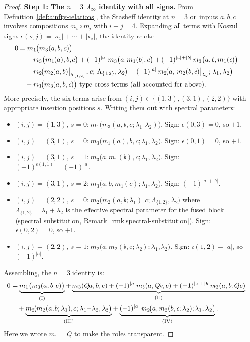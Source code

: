 \begin{proof}
\medskip
\textbf{Step 1: The $n=3$ $A_\infty$ identity with all signs.}
From Definition~\ref{def:ainfty-relations}, the Stasheff identity at $n=3$ on inputs $a,b,c$ involves compositions $m_i \circ m_j$ with $i+j=4$. Expanding all terms with Koszul signs $\epsilon(s,j) = |a_1|+\cdots+|a_s|$, the identity reads:
\begin{align}
0 &= m_1\bigl(m_3(a,b,c)\bigr) \notag\\
 &\quad + m_3\bigl(m_1(a),b,c\bigr)
 + (-1)^{|a|}\, m_3\bigl(a,m_1(b),c\bigr)
 + (-1)^{|a|+|b|}\, m_3\bigl(a,b,m_1(c)\bigr) \notag\\
 &\quad + m_2\!\bigl(m_2(a,b)\big|_{\Lambda_{\{1,2\}}},\, c;\, \Lambda_{\{1,2\}},\lambda_2\bigr)
 + (-1)^{|a|}\, m_2\!\bigl(a,\, m_2(b,c)\big|_{\lambda_2};\, \lambda_1, \lambda_2\bigr) \notag\\
 &\quad + m_1\!\bigl(m_3(a,b,c)\bigr)\text{-type cross terms (all accounted for above)}.
\end{align}
More precisely, the six terms arise from $(i,j) \in \{(1,3),(3,1),(2,2)\}$ with appropriate insertion positions $s$. Writing them out with spectral parameters:
\begin{itemize}
\item \emph{$(i,j)=(1,3)$, $s=0$}: $m_1\bigl(m_3(a,b,c;\lambda_1,\lambda_2)\bigr)$. Sign: $\epsilon(0,3)=0$, so $+1$.
\item \emph{$(i,j)=(3,1)$, $s=0$}: $m_3\bigl(m_1(a),b,c;\lambda_1,\lambda_2\bigr)$. Sign: $\epsilon(0,1)=0$, so $+1$.
\item \emph{$(i,j)=(3,1)$, $s=1$}: $m_3\bigl(a,m_1(b),c;\lambda_1,\lambda_2\bigr)$. Sign: $(-1)^{\epsilon(1,1)} = (-1)^{|a|}$.
\item \emph{$(i,j)=(3,1)$, $s=2$}: $m_3\bigl(a,b,m_1(c);\lambda_1,\lambda_2\bigr)$. Sign: $(-1)^{|a|+|b|}$.
\item \emph{$(i,j)=(2,2)$, $s=0$}: $m_2\!\bigl(m_2(a,b;\lambda_1),c;\Lambda_{\{1,2\}},\lambda_2\bigr)$ where $\Lambda_{\{1,2\}} = \lambda_1 + \lambda_2$ is the effective spectral parameter for the fused block (spectral substitution, Remark~\ref{rmk:spectral-substitution}). Sign: $\epsilon(0,2) = 0$, so $+1$.
\item \emph{$(i,j)=(2,2)$, $s=1$}: $m_2\!\bigl(a,m_2(b,c;\lambda_2);\lambda_1,\lambda_2\bigr)$. Sign: $\epsilon(1,2) = |a|$, so $(-1)^{|a|}$.
\end{itemize}

Assembling, the $n=3$ identity is:
\begin{align}
0 &= \underbrace{m_1\bigl(m_3(a,b,c)\bigr)}_{\text{(I)}}
 + \underbrace{m_3(Qa,b,c) + (-1)^{|a|} m_3(a,Qb,c) + (-1)^{|a|+|b|} m_3(a,b,Qc)}_{\text{(II)}} \notag\\
 &\quad + \underbrace{m_2\!\bigl(m_2(a,b;\lambda_1),c;\lambda_1{+}\lambda_2,\lambda_2\bigr)}_{\text{(III)}}
 + \underbrace{(-1)^{|a|}\, m_2\!\bigl(a,m_2(b,c;\lambda_2);\lambda_1,\lambda_2\bigr)}_{\text{(IV)}}.
\end{align}
Here we wrote $m_1 = Q$ to make the roles transparent.


\end{proof}
